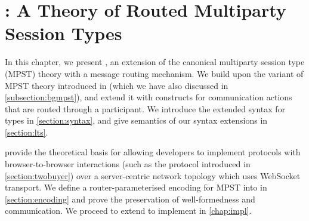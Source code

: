 \chapter{\newtheory: A Theory of
Routed Multiparty Session Types}
\label{chap:theory}

In this chapter, we present
\newtheory, an extension of the
canonical multiparty session type (MPST)
theory with a message routing mechanism.
We build upon the variant of MPST theory introduced
in \cite{LessIsMore}
(which we have also discussed in \cref{subsection:bgmpst}), 
and extend it
with constructs for communication actions
that are routed through a participant.
We introduce the extended syntax for types in 
\cref{section:syntax}, and give semantics of our
syntax extensions in \cref{section:lts}.

\newtheory provide the theoretical basis
for allowing developers to implement
protocols with browser-to-browser interactions
(such as the  protocol
introduced in \cref{section:twobuyer})
over a server-centric network topology
which uses WebSocket transport.
We define a router-parameterised encoding
for MPST into \newtheory in \cref{section:encoding}
and prove the preservation of well-formedness
and communication.
We proceed to extend \codegen to implement \newtheory
in \cref{chap:impl}.









